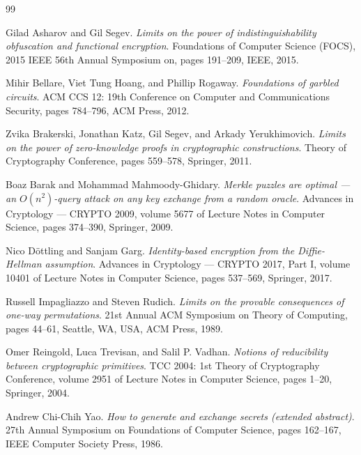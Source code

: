 \documentclass{aicr-conjecture}
\begin{document}
\begin{aicrbibliography}{99}

Gilad Asharov and Gil Segev.
\emph{Limits on the power of indistinguishability obfuscation and
functional encryption}.
Foundations of Computer Science (FOCS), 2015 IEEE 56th Annual Symposium
on, pages 191--209, IEEE, 2015.

Mihir Bellare, Viet Tung Hoang, and Phillip Rogaway.
\emph{Foundations of garbled circuits}.
ACM CCS 12: 19th Conference on Computer and Communications Security,
pages 784--796, ACM Press, 2012.

Zvika Brakerski, Jonathan Katz, Gil Segev, and Arkady Yerukhimovich.
\emph{Limits on the power of zero-knowledge proofs in cryptographic
constructions}.
Theory of Cryptography Conference, pages 559--578, Springer, 2011.

Boaz Barak and Mohammad Mahmoody-Ghidary.
\emph{Merkle puzzles are optimal --- an $O(n^{2})$-query attack on any key
exchange from a random oracle}.
Advances in Cryptology --- CRYPTO 2009, volume 5677 of Lecture Notes in
Computer Science, pages 374--390, Springer, 2009.

Nico D\"ottling and Sanjam Garg.
\emph{Identity-based encryption from the Diffie-Hellman assumption}.
Advances in Cryptology --- CRYPTO 2017, Part I, volume 10401 of Lecture
Notes in Computer Science, pages 537--569, Springer, 2017.

Russell Impagliazzo and Steven Rudich.
\emph{Limits on the provable consequences of one-way permutations}.
21st Annual ACM Symposium on Theory of Computing, pages 44--61, Seattle,
WA, USA, ACM Press, 1989.

Omer Reingold, Luca Trevisan, and Salil P. Vadhan.
\emph{Notions of reducibility between cryptographic primitives}.
TCC 2004: 1st Theory of Cryptography Conference, volume 2951 of Lecture
Notes in Computer Science, pages 1--20, Springer, 2004.

Andrew Chi-Chih Yao.
\emph{How to generate and exchange secrets (extended abstract)}.
27th Annual Symposium on Foundations of Computer Science, pages 162--167,
IEEE Computer Society Press, 1986.

\end{aicrbibliography}
\end{document}

